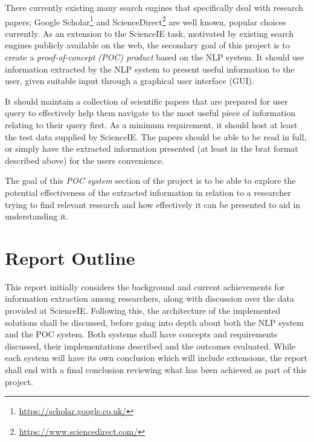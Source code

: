 There currently existing many search engines that specifically deal with research papers; Google Scholar\footnote{\href{https://scholar.google.co.uk/}{https://scholar.google.co.uk/}} and ScienceDirect\footnote{\href{https://www.sciencedirect.com/}{https://www.sciencedirect.com/}} are well known, popular choices currently. As an extension to the ScienceIE task, motivated by existing search engines publicly available on the web, the secondary goal of this project is to create a \textit{proof-of-concept (POC) product} based on the NLP system. It should use information extracted by the NLP system to present useful information to the user, given suitable input through a graphical user interface (GUI). 

It should maintain a collection of scientific papers that are prepared for user query to effectively help them navigate to the most useful piece of information relating to their query first. As a minimum requirement, it should host at least the test data supplied by ScienceIE. The papers should be able to be read in full, or simply have the extracted information presented (at least in the brat format described above) for the users convenience.

The goal of this \textit{POC system} section of the project is to be able to explore the potential effectiveness of the extracted information in relation to a researcher trying to find relevant research and how effectively it can be presented to aid in understanding it. 

\section{Report Outline}

This report initially considers the background and current achievements for information extraction among researchers, along with discussion over the data provided at ScienceIE. Following this, the architecture of the implemented solutions shall be discussed, before going into depth about both the NLP system and the POC system. Both systems shall have concepts and requirements discussed, their implementations described and the outcomes evaluated. While each system will have its own conclusion which will include extensions, the report shall end with a final conclusion reviewing what has been achieved as part of this project.



